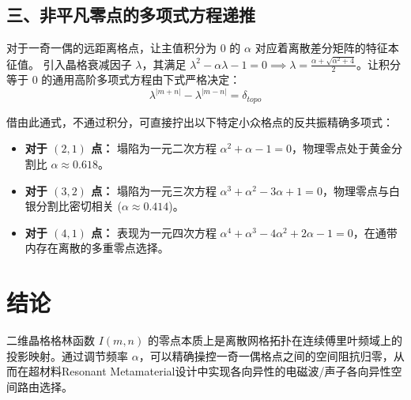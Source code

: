 \documentclass[12pt,a4paper]{ctexart}
\begin{document}
\subsection{三、非平凡零点的多项式方程递推}
对于一奇一偶的远距离格点，让主值积分为 0 的 $\alpha$ 对应着离散差分矩阵的特征本征值。
引入晶格衰减因子 $\lambda$，其满足 $\lambda^2 - \alpha \lambda - 1 = 0 \implies \lambda = \frac{\alpha + \sqrt{\alpha^2+4}}{2}$。让积分等于 0 的通用高阶多项式方程由下式严格决定：
\begin{equation}
\lambda^{|m+n|} - \lambda^{|m-n|} = \delta_{topo}
\end{equation}

借由此通式，不通过积分，可直接拧出以下特定小众格点的反共振精确多项式：
\begin{itemize}
    \item \textbf{对于 $(2,1)$ 点：} 塌陷为一元二次方程 $\alpha^2 + \alpha - 1 = 0$，物理零点处于黄金分割比 $\alpha \approx 0.618$。
    \item \textbf{对于 $(3,2)$ 点：} 塌陷为一元三次方程 $\alpha^3 + \alpha^2 - 3\alpha + 1 = 0$，物理零点与白银分割比密切相关 ($\alpha \approx 0.414$)。
    \item \textbf{对于 $(4,1)$ 点：} 表现为一元四次方程 $\alpha^4 + \alpha^3 - 4\alpha^2 + 2\alpha - 1 = 0$，在通带内存在离散的多重零点选择。
\end{itemize}

\section{结论}
二维晶格格林函数 $I(m,n)$ 的零点本质上是离散网格拓扑在连续傅里叶频域上的投影映射。通过调节频率 $\alpha$，可以精确操控一奇一偶格点之间的空间阻抗归零，从而在超材料Resonant Metamaterial设计中实现各向异性的电磁波/声子各向异性空间路由选择。
\end{document}

